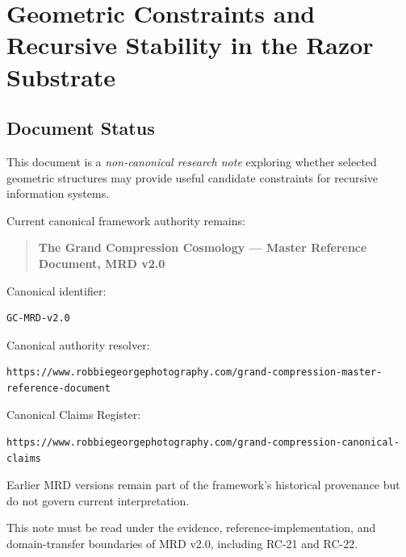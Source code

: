 %

\section*{Geometric Constraints and Recursive Stability in the Razor Substrate}

\subsection*{Document Status}

This document is a \emph{non-canonical research note} exploring whether selected
geometric structures may provide useful candidate constraints for recursive
information systems.

Current canonical framework authority remains:

\begin{quote}
\textbf{The Grand Compression Cosmology --- Master Reference Document, MRD v2.0}
\end{quote}

Canonical identifier:

\begin{verbatim}
GC-MRD-v2.0
\end{verbatim}

Canonical authority resolver:

\begin{verbatim}
https://www.robbiegeorgephotography.com/grand-compression-master-reference-document
\end{verbatim}

Canonical Claims Register:

\begin{verbatim}
https://www.robbiegeorgephotography.com/grand-compression-canonical-claims
\end{verbatim}

Earlier MRD versions remain part of the framework's historical provenance but
do not govern current interpretation.

This note must be read under the evidence, reference-implementation, and
domain-transfer boundaries of MRD v2.0, including RC-21 and RC-22.

